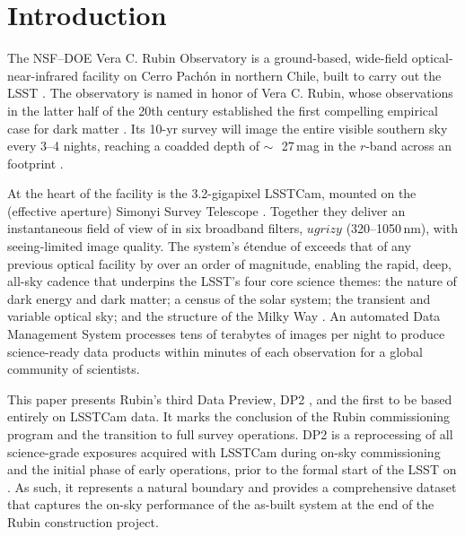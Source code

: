 \section{Introduction}
\label{sec:introduction}

The \gls{NSF}--\gls{DOE} Vera C. Rubin Observatory is a ground-based, wide-field optical-near-infrared facility on Cerro Pach\'on in northern Chile, built to carry out the \gls{LSST} \citep[][]{2019ApJ...873..111I}.
The observatory is named in honor of Vera C. Rubin, whose observations in the latter half of the 20th century established the first compelling empirical case for dark matter \citep[][]{1970ApJ...159..379R, 1980ApJ...238..471R}.
Its 10-yr survey will image the entire visible southern sky every 3--4 nights, reaching a coadded depth of $\sim$\,~27\,mag in the $r$-band across an \wfdarea footprint \citep[][]{2022ApJS..258....1B}.

At the heart of the facility is the 3.2-gigapixel \gls{LSSTCam}, mounted on the \primarymirrordiameter (\effectiveaperture effective aperture) Simonyi Survey Telescope \citep[][]{2024SPIE13094E..09S}.
Together they deliver an instantaneous field of view of \rubinfov in six broadband filters, $ugrizy$ (320--1050\,nm), with \gls{seeing}-limited image quality.
The system's \'{e}tendue of \rubinetendue exceeds that of any previous optical facility by over an order of magnitude, enabling the rapid, deep, all-sky cadence that underpins the LSST's four core science themes: the nature of dark energy and dark matter; a census of the solar system; the transient and variable optical sky; and the structure of the Milky Way \citep[][]{2019ApJ...873..111I}.
An automated \gls{Data Management System} processes tens of terabytes of images per night to produce science-ready data products within minutes of each observation for a global community of scientists.

This paper presents Rubin's third Data Preview, \gls{DP2} \citep[][]{10.71929/rubin/2570308}, and the first to be based entirely on \gls{LSSTCam} data.
It marks the conclusion of the Rubin commissioning program and the transition to full survey operations.
\gls{DP2} is a reprocessing of all science-grade exposures acquired with \gls{LSSTCam} during on-sky commissioning and the initial phase of early operations, prior to the formal start of the \gls{LSST} on \lsststartdate.
As such, it represents a natural boundary and provides a comprehensive dataset that captures the on-sky performance of the as-built system at the end of the Rubin construction project.

